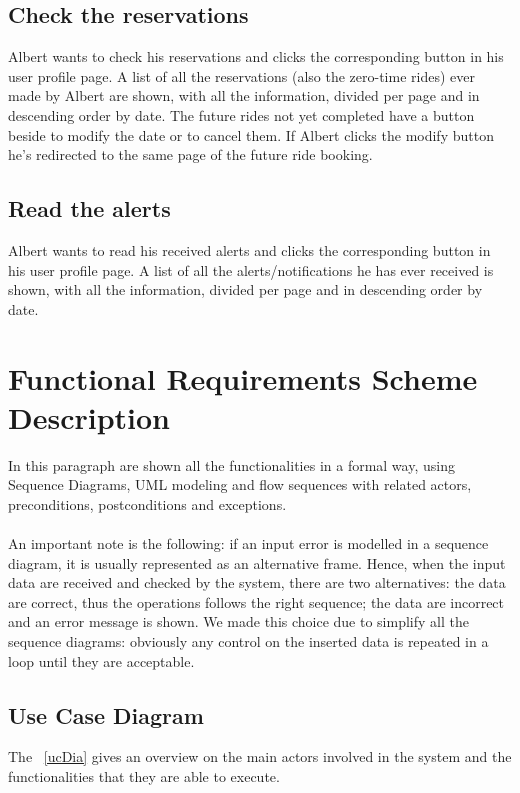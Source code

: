 \subsection{Check the reservations}
Albert wants to check his reservations and clicks the corresponding button in his user profile page. A list of all the reservations (also the zero-time rides) ever made by Albert are shown, with all the information, divided per page and in descending order by date. The future rides not yet completed have a button beside to modify the date or to cancel them. If Albert clicks the modify button he's redirected to the same page of the future ride booking.

\subsection{Read the alerts}
Albert wants to read his received alerts and clicks the corresponding button in his user profile page. A list of all the alerts/notifications he has ever received is shown, with all the information, divided per page and in descending order by date.



\section{Functional Requirements Scheme Description}
In this paragraph are shown all the functionalities in a formal way, using Sequence Diagrams, UML modeling and flow sequences with related actors, preconditions, postconditions and exceptions.\\
\\
An important note is the following: if an input error is modelled in a sequence diagram, it is usually represented as an alternative frame. Hence, when the input data are received and checked by the system, there are two alternatives: the data are correct, thus the operations follows the right sequence; the data are incorrect and an error message is shown. We made this choice due to simplify all the sequence diagrams: obviously any control on the inserted data is repeated in a loop until they are acceptable.


\subsection{Use Case Diagram}
The \figurename~\ref{ucDia} gives an overview on the main actors involved in the system and the functionalities that they are able to execute.

